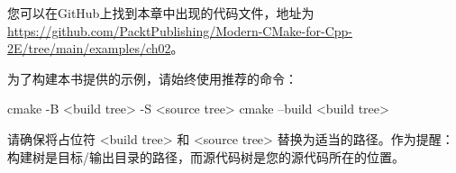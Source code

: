 您可以在GitHub上找到本章中出现的代码文件，地址为 \url{https://github.com/PacktPublishing/Modern-CMake-for-Cpp-2E/tree/main/examples/ch02}。

为了构建本书提供的示例，请始终使用推荐的命令：

\begin{shell}
cmake -B <build tree> -S <source tree>
cmake --build <build tree>
\end{shell}

请确保将占位符 <build tree> 和 <source tree> 替换为适当的路径。作为提醒：构建树是目标/输出目录的路径，而源代码树是您的源代码所在的位置。












